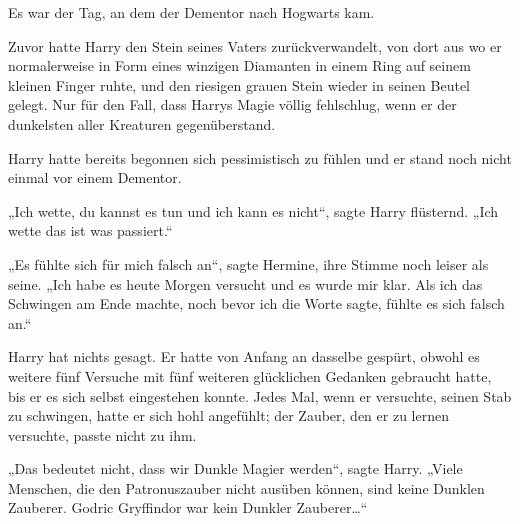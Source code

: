 Es war der Tag, an dem der Dementor nach Hogwarts kam.

Zuvor hatte Harry den Stein seines Vaters zurückverwandelt, von dort aus wo er normalerweise in Form eines winzigen Diamanten in einem Ring auf seinem kleinen Finger ruhte, und den riesigen grauen Stein wieder in seinen Beutel gelegt. Nur für den Fall, dass Harrys Magie völlig fehlschlug, wenn er der dunkelsten aller Kreaturen gegenüberstand.

Harry hatte bereits begonnen sich pessimistisch zu fühlen und er stand noch nicht einmal vor einem Dementor.

„Ich wette, du kannst es tun und ich kann es nicht“, sagte Harry flüsternd. „Ich wette das ist was passiert.“

„Es fühlte sich für mich falsch an“, sagte Hermine, ihre Stimme noch leiser als seine. „Ich habe es heute Morgen versucht und es wurde mir klar. Als ich das Schwingen am Ende machte, noch bevor ich die Worte sagte, fühlte es sich falsch an.“

Harry hat nichts gesagt. Er hatte von Anfang an dasselbe gespürt, obwohl es weitere fünf Versuche mit fünf weiteren glücklichen Gedanken gebraucht hatte, bis er es sich selbst eingestehen konnte. Jedes Mal, wenn er versuchte, seinen Stab zu schwingen, hatte er sich hohl angefühlt; der Zauber, den er zu lernen versuchte, passte nicht zu ihm.

„Das bedeutet nicht, dass wir Dunkle Magier werden“, sagte Harry. „Viele Menschen, die den Patronuszauber nicht ausüben können, sind keine Dunklen Zauberer. Godric Gryffindor war kein Dunkler Zauberer…“

